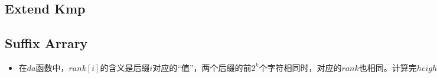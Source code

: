 	\subsection{Extend Kmp}
		
	\subsection{Suffix Arrary}
		\begin{flushleft}
			\begin{itemize}
				\item $在da函数中，rank[i]的含义是后缀i对应的“值”，两个后缀的前2^k个字符相同时，对应的rank也相同。计算完height后，rank[i]代表后缀i在sa[]中的位置。$
			\end{itemize}
		\end{flushleft}
		
